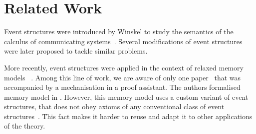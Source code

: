 \section{Related Work}

Event structures were introduced by Winskel to study the semantics of 
the calculus of communicating systems~\cite{Winskel:86, Winskel:82}. 
Several modifications of event structures~\cite{Langerak:91, Boudol-Castellani:1991}
were later proposed to tackle similar problems.  
 
More recently, event structures were applied 
in the context of relaxed memory models~%
\cite{Jeffrey-Riely:LICS16, PichonPharabod-Sewell:POPL16, Chakraborty-Vafeiadis:POPL19, Moiseenko-al:ECOOP20}.
Among this line of work, we are aware of only one paper~\cite{Moiseenko-al:ECOOP20}
that was accompanied by a mechanisation in a proof assistant. 
The authors formalised \weakestmo~\cite{Chakraborty-Vafeiadis:POPL19} 
memory model in \coq. However, this memory model uses 
a custom variant of event structures, that does not 
obey axioms of any conventional class of 
event structures~\cite{Winskel:82, Langerak:91, Boudol-Castellani:1991}. 
This fact makes it harder to reuse and adapt it 
to other applications of the theory. 


